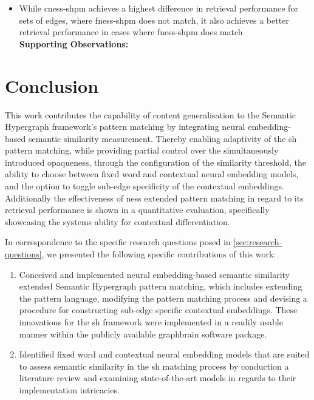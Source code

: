 \documentclass[11pt]{scrreprt}
\begin{document}
{\begin{itemize}
	\item While \gls{cness-shpm} achieves a highest difference in retrieval performance for sets of edges, where \gls{fness-shpm} does not match, it also achieves a better retrieval performance in cases where \gls{fness-shpm} does match \\
	\textbf{Supporting Observations:}  
		
\end{itemize}

\chapter{Conclusion}
This work contributes the capability of content generalisation to the Semantic Hypergraph framework's pattern matching by integrating neural embedding-based semantic similarity measurement. Thereby enabling adaptivity of the \gls{sh} pattern matching, while providing partial control over the simultaneously introduced opaqueness, through the configuration of the similarity threshold, the ability to choose between fixed word and contextual neural embedding models, and the option to toggle sub-edge specificity of the contextual embeddings. Additionally the effectiveness of \gls{ness} extended pattern matching in regard to its retrieval performance is shown in a quantitative evaluation, specifically showcasing the systems ability for contextual differentiation.

In correspondence to the specific research questions posed in \cref{sec:research-questions}, we presented the following specific  contributions of this work:

\begin{enumerate}[label=\textbf{C.\arabic*}, leftmargin=0pt, labelwidth=*, align=left, labelsep=0.5em, itemindent=0pt, listparindent=\parindent]
\item Conceived and implemented neural embedding-based semantic similarity extended Semantic Hypergraph pattern matching, which includes extending the pattern language, modifying the pattern matching process and devising a procedure for constructing sub-edge specific contextual embeddings. These innovations for the \gls{sh} framework were implemented in a readily usable manner within the publicly available graphbrain software package.

\item Identified fixed word and contextual neural embedding models that are suited to assess semantic similarity in the \gls{sh} matching process by conduction a literature review and examining state-of-the-art models in regards to their implementation intricacies. 


\end{enumerate}}
\end{document}

